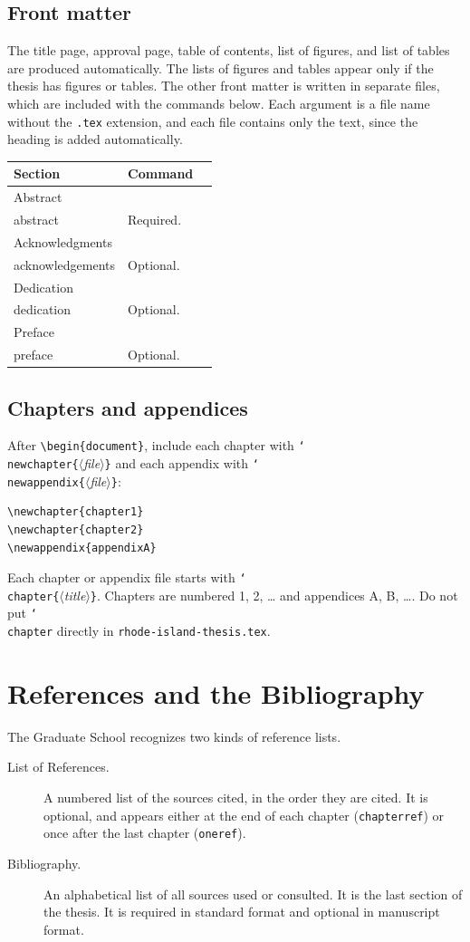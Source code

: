 \documentclass[11pt]{article}
\newcommand\cs[1]{\texttt{\char`\\#1}}
\newcommand\meta[1]{\textit{$\langle$#1$\rangle$}}
\newcommand\marg[1]{\texttt{\{}\meta{#1}\texttt{\}}}
\newcommand\opt[1]{\texttt{#1}}
\newcommand\file[1]{\texttt{#1}}
\begin{document}
\subsection{Front matter}

The title page, approval page, table of contents, list of figures, and list of
tables are produced automatically.
The lists of figures and tables appear only if the thesis has figures or
tables.
The other front matter is written in separate files, which are included with
the commands below.
Each argument is a file name without the \file{.tex} extension, and each file
contains only the text, since the heading is added automatically.

\medskip
\noindent
\begin{tabularx}{\linewidth}{@{}llX@{}}
\toprule
Section & Command & \\
\midrule
Abstract & \cs{abstract}\marg{file} & Required. \\
Acknowledgments & \cs{acknowledgements}\marg{file} & Optional. \\
Dedication & \cs{dedication}\marg{file} & Optional. \\
Preface & \cs{preface}\marg{file} & Optional. \\
\bottomrule
\end{tabularx}

\subsection{Chapters and appendices}

After \verb|\begin{document}|, include each chapter with
\cs{newchapter}\marg{file} and each appendix with \cs{newappendix}\marg{file}:
\begin{verbatim}
\newchapter{chapter1}
\newchapter{chapter2}
\newappendix{appendixA}
\end{verbatim}
Each chapter or appendix file starts with \cs{chapter}\marg{title}.
Chapters are numbered 1, 2, \ldots{} and appendices A, B, \ldots.
Do not put \cs{chapter} directly in \file{rhode-island-thesis.tex}.

\section{References and the Bibliography}

The Graduate School recognizes two kinds of reference lists.
\begin{description}
\item[List of References.] A numbered list of the sources cited, in the order
  they are cited. It is optional, and appears either at the end of each
  chapter (\opt{chapterref}) or once after the last chapter (\opt{oneref}).
\item[Bibliography.] An alphabetical list of all sources used or consulted.
  It is the last section of the thesis. It is required in standard format and
  optional in manuscript format.
\end{description}
\end{document}
